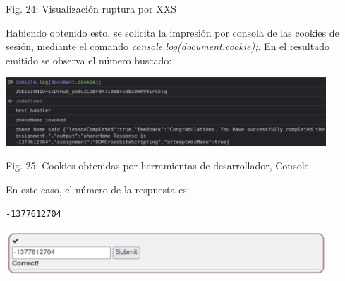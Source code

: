 \documentclass[12pt,oneside,a4paper]{book}
\begin{document}
\begin{enumerate}
\begin{enumerate}
\begin{center}
            \vspace{0.1em}
            
            Fig. 24: Visualización ruptura por XXS
        \end{center}
        
        \vspace{2em}

        \hspace{20pt}
        Habiendo obtenido esto, se solicita la impresión por consola de las cookies de sesión, mediante el comando \textit{console.log(document.cookie);}. En el resultado emitido se observa el número buscado:

        \vspace{2em}

        \begin{center}
            \includegraphics[width=12cm]{img/xss11.png}
            
            \vspace{0.1em}
            
            Fig. 25: Cookies obtenidas por herramientas de desarrollador, Console
        \end{center}
        
        \vspace{2em}

        \hspace{20pt}
        En este caso, el número de la respuesta es:
        
        \vspace{1em}

        \begin{verbatim}
-1377612704
        \end{verbatim}

        \begin{center}
            \includegraphics[width=12cm]{img/xss12.png}
            
            \vspace{0.1em}
            

\end{center}
\end{enumerate}
\end{enumerate}
\end{document}
